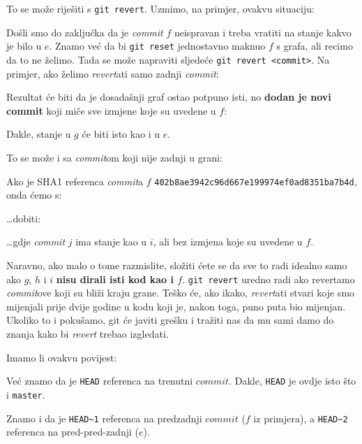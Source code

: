 To se može riješiti s \verb+git revert+. Uzmimo, na primjer, ovakvu situaciju:



Došli smo do zaključka da je \emph{commit} $f$ neispravan i treba vratiti na stanje kakvo je bilo u $e$.
Znamo već da bi \verb+git reset+ jednostavno maknuo $f$ s grafa, ali recimo da to ne želimo.
Tada se može napraviti sljedeće \verb+git revert <commit>+. 
Na primjer, ako želimo \emph{revert}ati samo zadnji \emph{commit}:


Rezultat će biti da je dosadašnji graf ostao potpuno isti, no \textbf{dodan je novi commit} koji miče sve izmjene koje su uvedene u $f$:



Dakle, stanje u $g$ će biti isto kao i u $e$.

To se može i sa \emph{commit}om koji nije zadnji u grani:



Ako je SHA1 referenca \emph{commit}a $f$ \verb+402b8ae3942c96d667e199974ef0ad8351ba7b4d+, onda ćemo s:


\dots{}dobiti:



\dots{}gdje \emph{commit} $j$ ima stanje kao u $i$, ali bez izmjena koje su uvedene u $f$.

Naravno, ako malo o tome razmislite, složiti ćete se da sve to radi idealno samo ako $g$, $h$ i $i$ \textbf{nisu dirali isti kod kao i $f$}.
\verb+git revert+ uredno radi ako revertamo \emph{commit}ove koji su bliži kraju grane.
Teško će, ako ikako, \emph{revert}ati stvari koje smo mijenjali prije dvije godine u kodu koji je, nakon toga, puno puta bio mijenjan.
Ukoliko to i pokušamo, git će javiti grešku i tražiti nas da mu sami damo do znanja kako bi \emph{revert} trebao izgledati.


Imamo li ovakvu povijest:



Već znamo da je \verb+HEAD+ referenca na trenutni $commit$.
Dakle, \verb+HEAD+ je ovdje isto što i \verb+master+.

Znamo i da je \verb+HEAD~1+ referenca na predzadnji $commit$ ($f$ iz primjera), a \verb+HEAD~2+ referenca na pred-pred-zadnji ($e$).

